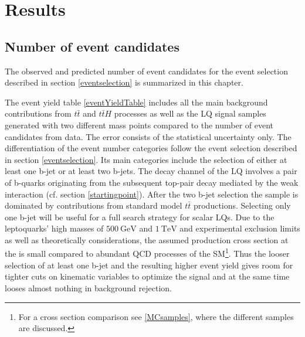 \chapter{Results}\label{results}
\section{Number of event candidates}\label{eventYield}
The observed and predicted number of event candidates for the event selection described in section \ref{eventselection} is summarized in this chapter.\par
The event yield table \ref{eventYieldTable} includes all the main background contributions from $t\bar{t}$ and $t\bar{t}H$ processes as well as the LQ signal samples generated with two different mass points compared to the number of event candidates from data. The error consists of the statistical uncertainty only. The differentiation of the event number categories follow the event selection described in section \ref{eventselection}. Its main categories include the selection of either at least one b-jet or at least two b-jets. The decay channel of the LQ involves a pair of b-quarks originating from the subsequent top-pair decay mediated by the weak interaction (cf. section \ref{startingpoint}). After the two b-jet selection the sample is dominated by contributions from standard model $t\bar{t}$ productions. Selecting only one b-jet will be useful for a full search strategy for scalar LQs. Due to the leptoquarks' high masses of $\SI{500}{\giga\electronvolt}$ and $\SI{1}{\tera\electronvolt}$ and experimental exclusion limits as well as theoretically considerations, the assumed production cross section at the {\LHC} is small compared to abundant QCD processes of the SM\footnote{For a cross section comparison see \ref{MCsamples}, where the different samples are discussed.}. Thus the looser selection of at least one b-jet and the resulting higher event yield gives room for tighter cuts on kinematic variables to optimize the signal and at the same time looses almost nothing in background rejection. \newline
%
